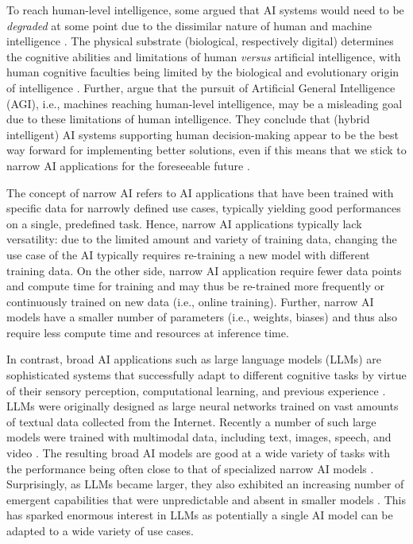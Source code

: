 To reach human-level intelligence, some argued that AI systems would need to be \textit{degraded} at some point due to the
dissimilar nature of human and machine intelligence \citep{kortelingHumanArtificialIntelligence2021}.
The physical substrate (biological, respectively digital) determines the cognitive abilities and limitations of human
\textit{versus} artificial intelligence, with human cognitive faculties being limited by the biological and evolutionary
origin of intelligence \citep{kortelingHumanArtificialIntelligence2021}. Further, \cite{kortelingHumanArtificialIntelligence2021}
argue that the pursuit of Artificial General Intelligence (AGI), i.e., machines reaching human-level intelligence, may
be a misleading goal due to these limitations of human intelligence. They conclude that (hybrid intelligent) AI systems
supporting human decision-making appear to be the best way forward for implementing better solutions, even if this means
that we stick to narrow AI applications for the foreseeable future \citep{kortelingHumanArtificialIntelligence2021}.

The concept of narrow AI refers to AI applications that have been trained with specific data for narrowly defined use
cases, typically yielding good performances on a single, predefined task. Hence, narrow AI applications typically lack
versatility: due to the limited amount and variety of training data, changing the use case of the AI typically
requires re-training a new model with different training data. On the other side, narrow AI application require fewer
data points and compute time for training and may thus be re-trained more frequently or continuously trained on new data
(i.e., online training). Further, narrow AI models have a smaller number of parameters (i.e., weights, biases) and
thus also require less compute time and resources at inference time.

In contrast, broad AI applications such as large language models (LLMs) are sophisticated systems that successfully
adapt to different cognitive tasks by virtue of their sensory perception, computational learning, and
previous experience \citep{hochreiterBroadAI2022}. LLMs were originally designed as large neural networks trained
on vast amounts of textual data collected from the Internet. Recently a number of such large models were trained
with multimodal data, including text, images, speech, and video \citep{bommasaniOpportunitiesRisksFoundation2022}.
The resulting broad AI models are good at a wide variety of tasks with the performance being often close to that of
specialized narrow AI models \citep{bommasaniOpportunitiesRisksFoundation2022}. Surprisingly, as LLMs became larger,
they also exhibited an increasing number of emergent capabilities that were unpredictable and absent in smaller models
\citep{weiEmergentAbilitiesLarge2022}. This has sparked enormous interest in LLMs as potentially a single AI model 
can be adapted to a wide variety of use cases. 

